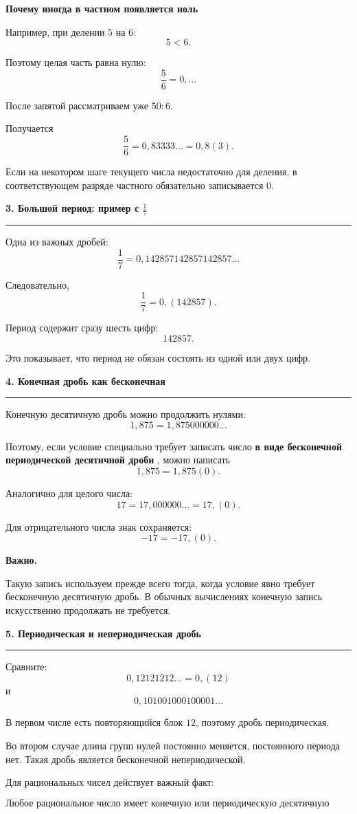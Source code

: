\documentclass[a4paper,12pt]{article}
\newcommand{\sectiontitle}[1]{%
    \vspace{0.8em}
    {\Large\bfseries\textcolor{darkaccent}{#1}}\par
    \vspace{0.25em}
    \textcolor{accent}{\rule{\linewidth}{0.7pt}}
    \vspace{0.5em}
}
\newcommand{\subsectiontitle}[1]{%
    \vspace{0.6em}
    {\large\bfseries\textcolor{accent}{#1}}\par
    \vspace{0.2em}
}
\newcommand{\important}[1]{%
    \textbf{\textcolor{darkaccent}{#1}}
}
\begin{document}
\subsectiontitle{Почему иногда в частном появляется ноль}

Например, при делении \(5\) на \(6\):
\[
5<6.
\]

Поэтому целая часть равна нулю:
\[
\frac56=0,\ldots
\]

После запятой рассматриваем уже \(50:6\).

Получается
\[
\frac56=0,83333\ldots=0,8(3).
\]

Если на некотором шаге текущего числа недостаточно для деления,
в соответствующем разряде частного обязательно записывается \(0\).

\sectiontitle{3. Большой период: пример с \(\frac17\)}

Одна из важных дробей:
\[
\frac17=0,142857142857142857\ldots
\]

Следовательно,
\[
\boxed{\frac17=0,(142857)}.
\]

Период содержит сразу шесть цифр:
\[
142857.
\]

Это показывает, что период не обязан состоять из одной или двух цифр.

\sectiontitle{4. Конечная дробь как бесконечная}

Конечную десятичную дробь можно продолжить нулями:
\[
1,875=1,875000000\ldots
\]

Поэтому, если условие специально требует записать число
\important{в виде бесконечной периодической десятичной дроби}, можно написать
\[
\boxed{1,875=1,875(0)}.
\]

Аналогично для целого числа:
\[
17=17,000000\ldots=17,(0).
\]

Для отрицательного числа знак сохраняется:
\[
-17=-17,(0).
\]

\important{Важно.}
Такую запись используем прежде всего тогда, когда условие явно требует
бесконечную десятичную дробь. В обычных вычислениях конечную запись
искусственно продолжать не требуется.

\sectiontitle{5. Периодическая и непериодическая дробь}

Сравните:
\[
0,12121212\ldots=0,(12)
\]
и
\[
0,101001000100001\ldots
\]

В первом числе есть повторяющийся блок \(12\), поэтому дробь периодическая.

Во втором случае длина групп нулей постоянно меняется, постоянного периода
нет. Такая дробь является бесконечной непериодической.

Для рациональных чисел действует важный факт:

\[
\boxed{
\text{Любое рациональное число имеет конечную или периодическую
десятичную запись.}
}
\]
\end{document}

